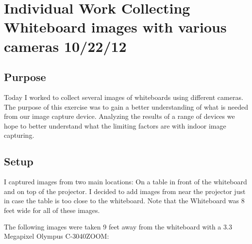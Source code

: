 \documentclass[]{article}
\begin{document}
	\tableofcontents
	\newpage
	
	\section{Individual Work Collecting Whiteboard images with various cameras 10/22/12}
		\subsection{Purpose}
		Today I worked to collect several images of whiteboards using different cameras. The purpose of this exercise was to gain a better understanding of what is needed from our image capture device. Analyzing the results of a range of devices we hope to better understand what the limiting factors are with indoor image capturing. \\
		\subsection{Setup}
		I captured images from two main locations: On a table in front of the whiteboard and on top of the projector. I decided to add images from near the projector just in case the table is too close to the whiteboard.
		Note that the Whiteboard was 8 feet wide for all of these images.
		
		The following images were taken 9 feet away from the whiteboard with a 3.3 Megapixel Olympus C-3040ZOOM: \\
		
\end{document}
